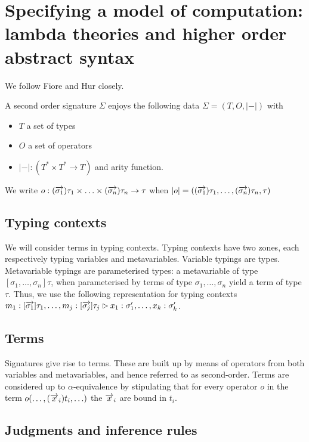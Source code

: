 \section{Specifying a model of computation: lambda theories and higher order abstract syntax}

We follow Fiore and Hur \cite{DBLP:conf/csl/FioreH10} closely.

\begin{definition}
  A second order signature $\Sigma$ enjoys the following data $\Sigma = (T,O,|-|)$ with
  \begin{itemize}
    \item $T$ a set of types
    \item $O$ a set of operators
      \item $|-| : (T^{*} \times T^{*} \to T)$ and arity function.
  \end{itemize}  
\end{definition}

We write $o : (\overrightarrow{\sigma_{1}})\tau_{1} \times \ldots \times (\overrightarrow{\sigma_{n}})\tau_{n} \to \tau$ when $|o| = ((\overrightarrow{\sigma_{1}})\tau_{1}, \ldots, (\overrightarrow{\sigma_{n}})\tau_{n}, \tau)$

\subsection{Typing contexts}
We will consider terms in typing contexts. Typing contexts have two
zones, each respectively typing variables and metavariables. Variable
typings are types. Metavariable typings are parameterised types: a
metavariable of type $[\sigma_{1},\ldots,\sigma_{n}]\tau$, when
parameterised by terms of type $\sigma_{1},\ldots,\sigma_{n}$ yield a
term of type $\tau$. Thus, we use the following representation for
typing contexts $m_{1} : [\overrightarrow{\sigma_{1}}]\tau_{1}, \ldots, m_{j}: [\overrightarrow{\sigma_{j}}]\tau_{j} \rhd x_{1} : \sigma'_{1}, \ldots, x_{k}: \sigma'_{k}$.

\subsection{Terms}
 Signatures give rise to terms. These are built up by means of operators
from both variables and metavariables, and hence referred to as second-order.
Terms are considered up to $\alpha$-equivalence by stipulating that for every operator $o$ in the term $o(\ldots,(\overrightarrow{x}_{i})t_{i},\ldots)$ the $\overrightarrow{x}_{i}$ are bound in $t_{i}$.

\subsection{Judgments and inference rules}

